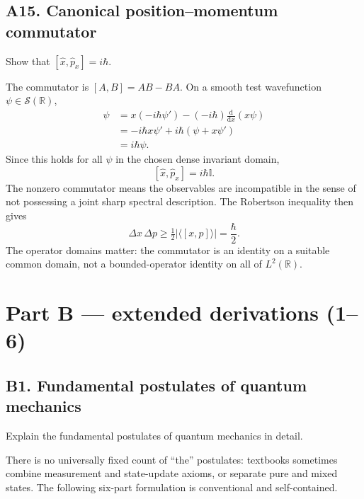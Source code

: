 \documentclass[11pt,a4paper]{article}
\newcommand{\dd}{\mathrm{d}}
\newcommand{\R}{\mathbb R}
\newcommand{\id}{\mathbb I}
\newcommand{\half}{\tfrac12}
\begin{document}
\subsection{A15. Canonical position--momentum commutator}
\begin{questionbox}Show that $[\hat x,\hat p_x]=i\hbar$.\end{questionbox}
The commutator is $[A,B]=AB-BA$. On a smooth test wavefunction $\psi\in\mathcal S(\R)$,
\begin{align}
[\hat x,\hat p]\psi
&=x\left(-i\hbar\psi'\right)-(-i\hbar)\frac{\dd}{\dd x}(x\psi)\\
&=-i\hbar x\psi'+i\hbar(\psi+x\psi')\\
&=i\hbar\psi.
\end{align}
Since this holds for all $\psi$ in the chosen dense invariant domain,
\begin{equation}\boxed{[\hat x,\hat p_x]=i\hbar\id.}\end{equation}
The nonzero commutator means the observables are incompatible in the sense of not possessing a joint sharp spectral description. The Robertson inequality then gives
\begin{equation}
\Delta x\,\Delta p\ge\half\left|\langle[x,p]\rangle\right|=\boxed{\frac\hbar2}.
\end{equation}
The operator domains matter: the commutator is an identity on a suitable common domain, not a bounded-operator identity on all of $L^2(\R)$.

\section{Part B --- extended derivations (1--6)}
\subsection{B1. Fundamental postulates of quantum mechanics}
\begin{questionbox}Explain the fundamental postulates of quantum mechanics in detail.\end{questionbox}
There is no universally fixed count of ``the'' postulates: textbooks sometimes combine measurement and state-update axioms, or separate pure and mixed states. The following six-part formulation is conventional and self-contained.
\end{document}
